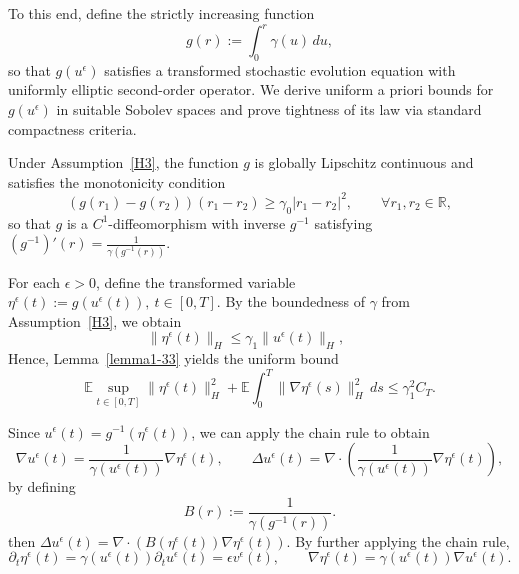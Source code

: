 \documentclass[11pt]{article}
\theoremstyle{plain}
\numberwithin{equation}{section}
\begin{document}
 

\medskip
To this end, define the strictly increasing function
\begin{equation}\label{damping-g}
g(r) := \int_0^r \gamma(u)\,du,
\end{equation}
so that $ g(u^\epsilon)$ satisfies a transformed stochastic evolution equation with uniformly elliptic second-order operator. We derive uniform a priori bounds for $g(u^\epsilon)$ in suitable Sobolev spaces and prove tightness of its law via standard compactness criteria.
 

\medskip
Under Assumption~\ref{H3}, the function $g$ is globally Lipschitz continuous and satisfies the monotonicity condition
\begin{equation}
(g(r_1) - g(r_2))(r_1 - r_2) \geq \gamma_0 |r_1 - r_2|^2, \qquad \forall r_1, r_2 \in \mathbb{R},
\end{equation}
so that $g$ is a $C^1$-diffeomorphism with inverse $g^{-1}$ satisfying \((g^{-1})'(r) = \frac{1}{\gamma(g^{-1}(r))}.\)

\medskip
For each $\epsilon>0$, define the transformed variable \(\eta^\epsilon(t) := g(u^\epsilon(t)), ~ t \in [0,T].\)
By the boundedness of $\gamma$ from Assumption~\ref{H3}, we obtain
\begin{equation}\label{lemma-g-1}
\|\eta^\epsilon(t)\|_H \leq \gamma_1 \|u^\epsilon(t)\|_H, \qquad 
\end{equation}
Hence, Lemma~\ref{lemma1-33} yields the uniform bound
\begin{equation}\label{lemma-g-2}
\mathbb{E}\sup_{t\in [0,T]}\|\eta^\epsilon(t)\|_H^2  +\mathbb{E}\int_0^T \|\nabla \eta^{\epsilon}(s)\|_{H}^2\,ds
\leq \gamma_1^2 C_T.
\end{equation}

\medskip
Since $u^\epsilon(t) = g^{-1}(\eta^\epsilon(t))$, we can apply the chain rule to obtain
\[
\nabla u^\epsilon(t) = \frac{1}{\gamma(u^\epsilon(t))} \nabla \eta^\epsilon(t), \qquad
\Delta u^\epsilon(t) = \nabla \cdot \left( \frac{1}{\gamma(u^\epsilon(t))} \nabla \eta^\epsilon(t) \right),
\]
by defining 
\begin{equation}\label{def-B}
B(r) := \frac{1}{\gamma(g^{-1}(r))}.
\end{equation}
then \(\Delta u^\epsilon(t) = \nabla \cdot (B(\eta^\epsilon(t)) \nabla \eta^\epsilon(t)).\)
By further applying the chain rule,
\[
\partial_t \eta^\epsilon(t) = \gamma(u^\epsilon(t)) \partial_t u^\epsilon(t)= \epsilon   v^\epsilon(t) , \qquad
\nabla \eta^\epsilon(t) = \gamma(u^\epsilon(t)) \nabla u^\epsilon(t).
\]
\end{document}
